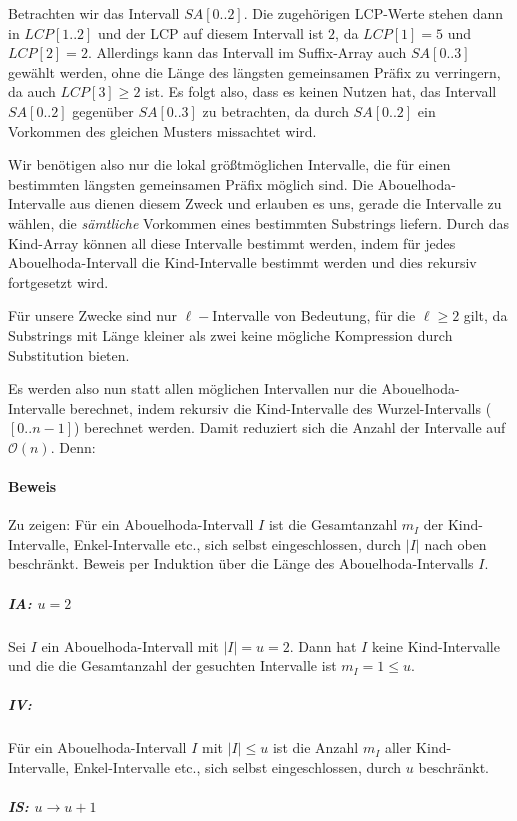 Betrachten wir das Intervall $SA[0..2]$.
Die zugehörigen LCP-Werte stehen dann in $LCP[1..2]$ und der LCP auf diesem Intervall ist $2$, da $LCP[1] = 5$ und $LCP[2] = 2$. Allerdings kann das Intervall im Suffix-Array auch $SA[0..3]$ gewählt werden, ohne die Länge des längsten gemeinsamen Präfix zu verringern, da auch $LCP[3] \geq 2$ ist. 
Es folgt also, dass es keinen Nutzen hat, das Intervall $SA[0..2]$ gegenüber $SA[0..3]$ zu betrachten, da durch $SA[0..2]$ ein Vorkommen des gleichen Musters missachtet wird.

Wir benötigen also nur die lokal größtmöglichen Intervalle, die für einen bestimmten längsten gemeinsamen Präfix möglich sind. Die Abouelhoda-Intervalle aus \cite{abouelhoda_optimal_2002} dienen diesem Zweck und erlauben es uns, gerade die Intervalle zu wählen, die \emph{sämtliche} Vorkommen eines bestimmten Substrings liefern. Durch das Kind-Array können all diese Intervalle bestimmt werden, indem für jedes Abouelhoda-Intervall die Kind-Intervalle bestimmt werden und dies rekursiv fortgesetzt wird. 

Für unsere Zwecke sind nur $\ell-$Intervalle von Bedeutung, für die $\ell \geq 2$ gilt, da Substrings mit Länge kleiner als zwei keine mögliche Kompression durch Substitution bieten.

Es werden also nun statt allen möglichen Intervallen nur die Abouelhoda-Intervalle berechnet, indem rekursiv die Kind-Intervalle des Wurzel-Intervalls ($[0..n-1]$) berechnet werden. Damit reduziert sich die Anzahl der Intervalle auf $\mathcal{O}(n)$. Denn:

\paragraph{Beweis}
Zu zeigen: Für ein Abouelhoda-Intervall $I$ ist die Gesamtanzahl $m_I$ der Kind-Intervalle, Enkel-Intervalle etc., sich selbst eingeschlossen, durch $|I|$ nach oben beschränkt. Beweis per Induktion über die Länge des Abouelhoda-Intervalls $I$.

\subparagraph{IA: $u = 2$}
Sei $I$ ein Abouelhoda-Intervall mit $|I| = u = 2$. Dann hat $I$ keine Kind-Intervalle und die die Gesamtanzahl der gesuchten Intervalle ist $m_I = 1 \leq u$.

\subparagraph{IV:} Für ein Abouelhoda-Intervall $I$ mit $|I| \leq u$ ist die Anzahl $m_I$ aller Kind-Intervalle, Enkel-Intervalle etc., sich selbst eingeschlossen, durch $u$ beschränkt.

\subparagraph{IS: $u \rightarrow u + 1$}


